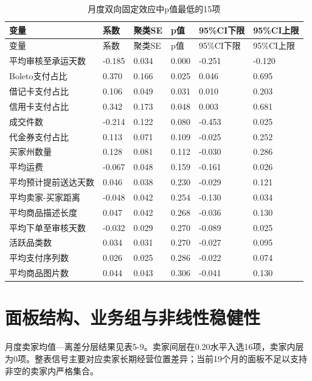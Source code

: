 \documentclass{sufethesismas}
\begin{document}
\begin{longtable}[]{@{}llllll@{}}
\caption{月度双向固定效应中p值最低的15项}\tabularnewline
\toprule\noalign{}
变量 & 系数 & 聚类SE & p值 & 95\%CI下限 & 95\%CI上限 \\
\midrule\noalign{}
\endfirsthead
\toprule\noalign{}
变量 & 系数 & 聚类SE & p值 & 95\%CI下限 & 95\%CI上限 \\
\midrule\noalign{}
\endhead
\bottomrule\noalign{}
\endlastfoot
平均审核至承运天数 & -0.185 & 0.034 & 0.000 & -0.251 & -0.120 \\
Boleto支付占比 & 0.370 & 0.166 & 0.025 & 0.046 & 0.695 \\
借记卡支付占比 & 0.106 & 0.049 & 0.031 & 0.010 & 0.203 \\
信用卡支付占比 & 0.342 & 0.173 & 0.048 & 0.003 & 0.681 \\
成交件数 & -0.214 & 0.122 & 0.080 & -0.453 & 0.025 \\
代金券支付占比 & 0.113 & 0.071 & 0.109 & -0.025 & 0.252 \\
买家州数量 & 0.128 & 0.081 & 0.112 & -0.030 & 0.286 \\
平均运费 & -0.067 & 0.048 & 0.159 & -0.161 & 0.026 \\
平均预计提前送达天数 & 0.046 & 0.038 & 0.230 & -0.029 & 0.121 \\
平均卖家-买家距离 & -0.048 & 0.042 & 0.254 & -0.130 & 0.034 \\
平均商品描述长度 & 0.047 & 0.042 & 0.268 & -0.036 & 0.130 \\
平均下单至审核天数 & -0.032 & 0.029 & 0.270 & -0.089 & 0.025 \\
活跃品类数 & 0.034 & 0.031 & 0.270 & -0.027 & 0.095 \\
平均支付序列数 & 0.026 & 0.025 & 0.286 & -0.022 & 0.074 \\
平均商品图片数 & 0.044 & 0.043 & 0.306 & -0.041 & 0.130 \\
\end{longtable}

\section{面板结构、业务组与非线性稳健性}

月度卖家均值---离差分层结果见表5-9。卖家间层在0.20水平入选16项，卖家内层为0项。整表信号主要对应卖家长期经营位置差异；当前19个月的面板不足以支持非空的卖家内严格集合。
\end{document}
